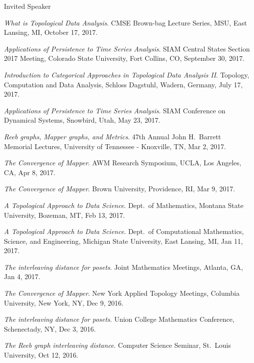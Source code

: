 \documentclass{resume} %
\begin{document}
\begin{rSection}{Invited Speaker}
\begin{etaremune}
\item\emph{What is Topological Data Analysis}. CMSE Brown-bag Lecture Series, MSU, East Lansing, MI, October 17, 2017. 

\item\emph{Applications of Persistence to Time Series Analysis}. SIAM Central States Section 2017 Meeting, Colorado State University, Fort Collins, CO, September 30, 2017. 

\item\emph{Introduction to Categorical Approaches in Topological Data Analysis II}. Topology, Computation and Data Analysis, Schloss Dagstuhl, Wadern, Germany, July 17, 2017. 

\item\emph{Applications of Persistence to Time Series Analysis}. SIAM Conference on Dynamical Systems, Snowbird, Utah, May 23, 2017. 

\item\emph{Reeb graphs, Mapper graphs, and Metrics}. 47th Annual John H.~Barrett Memorial Lectures, University of Tennessee - Knoxville, TN, Mar 2, 2017. 

\item\emph{The Convergence of Mapper}. AWM Research Symposium, UCLA, Los Angeles, CA, Apr 8, 2017. 

\item\emph{The Convergence of Mapper}. Brown University, Providence, RI, Mar 9, 2017. 

\item\emph{A Topological Approach to Data Science}. Dept.~of Mathematics, Montana State University, Bozeman, MT, Feb 13, 2017. 

\item\emph{A Topological Approach to Data Science}. Dept.~of Computational Mathematics, Science, and Engineering, Michigan State University, East Lansing, MI, Jan 11, 2017. 

\item\emph{The interleaving distance for posets}. Joint Mathematics Meetings, Atlanta, GA, Jan 4, 2017. 

\item\emph{The Convergence of Mapper}. New York Applied Topology Meetings, Columbia University, New York, NY, Dec 9, 2016. 

\item\emph{The interleaving distance for posets}. Union College Mathematics Conference, Schenectady, NY, Dec 3, 2016. 

\item\emph{The Reeb graph interleaving distance}. Computer Science Seminar, St.~Louis University, Oct 12, 2016. 


\end{etaremune}
\end{rSection}
\end{document}
